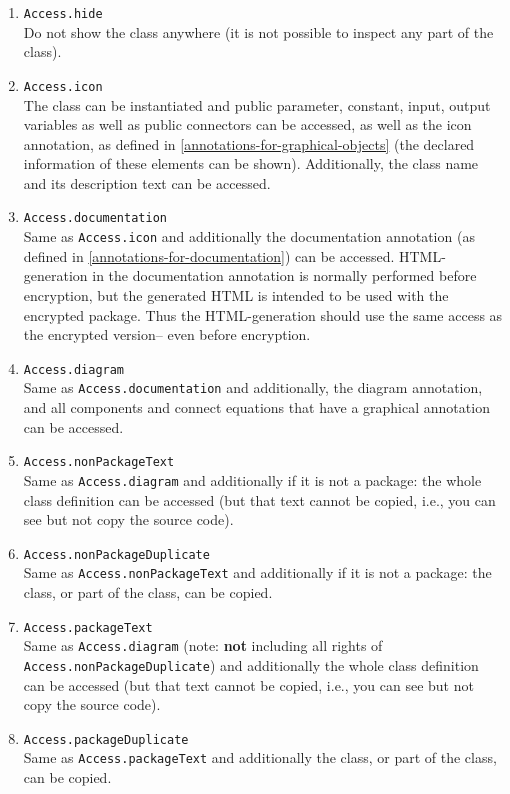 \begin{enumerate}
\item
  \lstinline!Access.hide!\\
  Do not show the class anywhere (it is not possible to inspect any part
  of the class).
\item
  \lstinline!Access.icon!\\
  The class can be instantiated and public parameter, constant, input,
  output variables as well as public connectors can be accessed, as well
  as the icon annotation, as defined in \autoref{annotations-for-graphical-objects} (the declared
  information of these elements can be shown). Additionally, the class
  name and its description text can be accessed.
\item
  \lstinline!Access.documentation!\\
  Same as \lstinline!Access.icon! and additionally the documentation annotation (as
  defined in \autoref{annotations-for-documentation}) can be accessed. HTML-generation in the
  documentation annotation is normally performed before encryption, but
  the generated HTML is intended to be used with the encrypted package.
  Thus the HTML-generation should use the same access as the encrypted
  version-- even before encryption.
\item
  \lstinline!Access.diagram!\\
  Same as \lstinline!Access.documentation! and additionally, the diagram annotation,
  and all components and connect equations that have a graphical
  annotation can be accessed.
\item
  \lstinline!Access.nonPackageText!\\
  Same as \lstinline!Access.diagram! and additionally if it is not a package: the
  whole class definition can be accessed (but that text cannot be copied, i.e., you can see but not copy the source code).
\item
  \lstinline!Access.nonPackageDuplicate!\\
  Same as \lstinline!Access.nonPackageText! and additionally if it is not a package:
  the class, or part of the class, can be copied.
\item
  \lstinline!Access.packageText!\\
  Same as \lstinline!Access.diagram! (note: \textbf{not} including all rights of
  \lstinline!Access.nonPackageDuplicate!) and additionally the whole class
  definition can be accessed (but that text cannot be copied, i.e., you can see but not copy the source code).
\item
  \lstinline!Access.packageDuplicate!\\
  Same as \lstinline!Access.packageText! and additionally the class, or part of the
  class, can be copied.
\end{enumerate}

